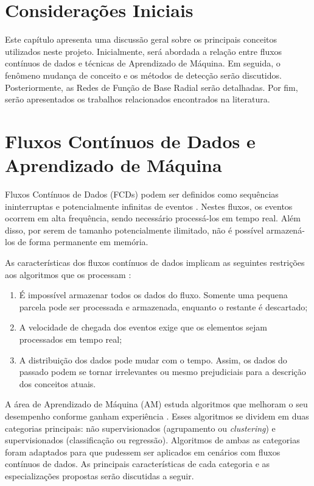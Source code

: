 \documentclass[msc, classic, a4paper]{ufbathesis}
\begin{document}
 \label{revisao_bibliografica}
\section{Considerações Iniciais}

Este capítulo apresenta uma discussão geral sobre os principais conceitos utilizados neste projeto.
%
Inicialmente, será abordada a relação entre fluxos contínuos de dados e técnicas de Aprendizado de Máquina.
%
Em seguida, o fenômeno mudança de conceito e os métodos de detecção serão discutidos.
%
Posteriormente, as Redes de Função de Base Radial serão detalhadas.
%
Por fim, serão apresentados os trabalhos relacionados encontrados na literatura.

\section{Fluxos Contínuos de Dados e Aprendizado de Máquina}

Fluxos Contínuos de Dados (FCDs) podem ser definidos como sequências ininterruptas e potencialmente infinitas de eventos \cite{Aggarwal:2006:DSM:1196418}.
%
Nestes fluxos, os eventos ocorrem em alta frequência, sendo necessário processá-los em tempo real.
%
Além disso, por serem de tamanho potencialmente ilimitado, não é possível armazená-los de forma permanente em memória.
%

As características dos fluxos contínuos de dados implicam as seguintes restrições aos algoritmos que os processam \cite{bifet2009data}:
%
\begin{enumerate}
    \item É impossível armazenar todos os dados do fluxo. Somente uma pequena parcela pode ser processada e armazenada, enquanto o restante é descartado;
    \item A velocidade de chegada dos eventos exige que os elementos sejam processados em tempo real;
    \item A distribuição dos dados pode mudar com o tempo. Assim, os dados do passado podem se tornar irrelevantes ou mesmo prejudiciais para a descrição dos conceitos atuais.
\end{enumerate}

A área de Aprendizado de Máquina (AM) estuda algoritmos que melhoram o seu desempenho conforme ganham experiência \cite{Mitchell:1997:ML:541177}.
%
Esses algoritmos se dividem em duas categorias principais:
%
não supervisionados (agrupamento ou \textit{clustering}) e supervisionados (classificação ou regressão).
%
Algoritmos de ambas as categorias foram adaptados para que pudessem ser aplicados em cenários com fluxos contínuos de dados.
%
As principais características de cada categoria e as especializações propostas serão discutidas a seguir.
\end{document}
